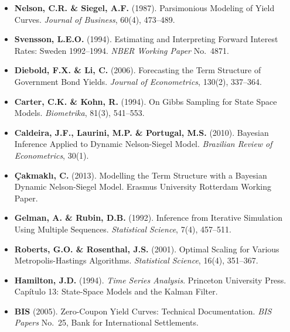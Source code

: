 \documentclass[12pt, a4paper]{article}
\theoremstyle{plain}
\theoremstyle{definition}
\theoremstyle{remark}
\begin{document}
\begin{itemize}[leftmargin=1.5em, itemsep=4pt]

\item \textbf{Nelson, C.R. \& Siegel, A.F.} (1987).
  Parsimonious Modeling of Yield Curves.
  \textit{Journal of Business}, 60(4), 473--489.

\item \textbf{Svensson, L.E.O.} (1994).
  Estimating and Interpreting Forward Interest Rates: Sweden 1992--1994.
  \textit{NBER Working Paper} No.\ 4871.

\item \textbf{Diebold, F.X. \& Li, C.} (2006).
  Forecasting the Term Structure of Government Bond Yields.
  \textit{Journal of Econometrics}, 130(2), 337--364.

\item \textbf{Carter, C.K. \& Kohn, R.} (1994).
  On Gibbs Sampling for State Space Models.
  \textit{Biometrika}, 81(3), 541--553.

\item \textbf{Caldeira, J.F., Laurini, M.P. \& Portugal, M.S.} (2010).
  Bayesian Inference Applied to Dynamic Nelson-Siegel Model.
  \textit{Brazilian Review of Econometrics}, 30(1).

\item \textbf{Çakmaklı, C.} (2013).
  Modelling the Term Structure with a Bayesian Dynamic Nelson-Siegel Model.
  Erasmus University Rotterdam Working Paper.

\item \textbf{Gelman, A. \& Rubin, D.B.} (1992).
  Inference from Iterative Simulation Using Multiple Sequences.
  \textit{Statistical Science}, 7(4), 457--511.

\item \textbf{Roberts, G.O. \& Rosenthal, J.S.} (2001).
  Optimal Scaling for Various Metropolis-Hastings Algorithms.
  \textit{Statistical Science}, 16(4), 351--367.

\item \textbf{Hamilton, J.D.} (1994).
  \textit{Time Series Analysis}. Princeton University Press.
  Capítulo 13: State-Space Models and the Kalman Filter.

\item \textbf{BIS} (2005).
  Zero-Coupon Yield Curves: Technical Documentation.
  \textit{BIS Papers} No.\ 25, Bank for International Settlements.

\end{itemize}
\end{document}
